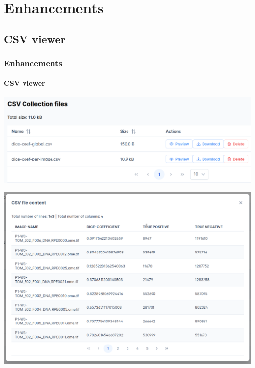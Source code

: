 \def\sectiontitle{Enhancements}

\section{\sectiontitle}

\def\slidetitle{CSV viewer}

\subsection{\slidetitle}
\begin{frame}
  \frametitle{\sectiontitle}
  \framesubtitle{\slidetitle}

  \begin{minipage}[h!]{0.10\textwidth}
    \includegraphics[scale=0.16]{./img/csv_actions.png}
  \end{minipage}\hfill
  \begin{minipage}[h!]{0.45\textwidth}
    \includegraphics[scale=0.18]{./img/csv_content.png}
  \end{minipage}
\end{frame}

